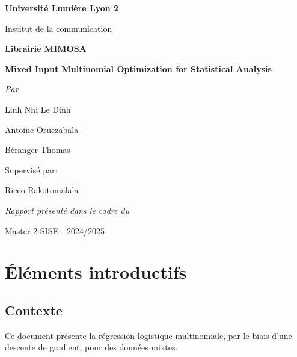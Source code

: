 \documentclass[10pt,french]{report}
\begin{document}
	
	\begin{titlepage}
		\centering
		{\Large\bfseries Université Lumière Lyon 2}\par
		{\large Institut de la communication}\par\vspace{4.5cm}
		
		
		{\Huge\bfseries Librairie MIMOSA}\par\vspace{1cm}
		{\huge\bfseries Mixed Input Multinomial Optimization for Statistical Analysis}\par\vspace{4.5cm}
		
		{\Large\itshape Par}\par
		{\Large Linh Nhi Le Dinh}\par
		{\Large Antoine Oruezabala}\par
		{\Large Béranger Thomas}\par\vspace{1cm}
		
		{\large Supervisé par:}\par
		{\large Ricco Rakotomalala}\par\vspace{1cm}
		
		{\large\itshape Rapport présenté dans le cadre du}\par
		{\large Master 2 SISE - 2024/2025}\par\vspace{1cm}
		
		
		\vfill
		
	\end{titlepage}
	
	\tableofcontents
	
	\setlength{\parskip}{12pt}
	
	\chapter{Éléments introductifs}
	
	\section{Contexte}
	
	Ce document présente la régression logistique multinomiale, par le biais d'une descente de gradient, pour des données mixtes.
	
\end{document}
